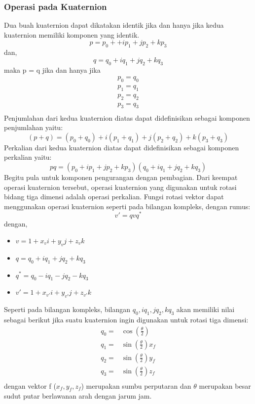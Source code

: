 \subsubsection{Operasi pada Kuaternion}
\label{sssec:operasi_pada_kuaternion}
Dua buah kuaternion dapat dikatakan identik jika dan hanya jika kedua kuaternion memiliki komponen yang identik.
\[
	p = p_0 + +ip_1+jp_2+kp_3
\]
dan,
\[
	q = q_0 + i q_1 + j q_2 + k q_3
\]
maka p = q jika dan hanya jika
\begin{equation}
	\begin{split}
	p_0=q_0\\
	p_1=q_1\\
	p_2=q_2\\
	p_3=q_3\\
	\end{split}
\end{equation}
Penjumlahan dari kedua kuaternion diatas dapat didefinisikan sebagai komponen penjumlahan yaitu:
\[
	(p+q)=(p_0+q_0)+i(p_1+q_1)+j(p_2+q_2)+k(p_3+q_3)
\]
Perkalian dari kedua kuaternion diatas dapat didefinisikan sebagai komponen perkalian yaitu:
\[
	pq = (p_0 +ip_1+jp_2+kp_3)(q_0 + i q_1 + j q_2 + k q_3)
\]
Begitu pula untuk komponen pengurangan dengan pembagian. 
Dari keempat operasi kuaternion tersebut, operasi kuaternion yang digunakan untuk rotasi bidang tiga dimensi adalah operasi perkalian. Fungsi rotasi vektor dapat menggunakan operasi kuaternion seperti pada bilangan kompleks, dengan rumus:
\[
	v' = qvq^*
\]
dengan,
\begin{itemize}
	\item \(v = 1 + x_v i +y_v j + z_v k\)
	\item \(q = q_0 + i q_1 + j q_2 + k q_3	\)
	\item \(q^* =  q_0 - i q_1 - j q_2 - k q_3\)
	\item \(v' = 1 + x_{v'} i +y_{v'} j + z_{v'} k\)
\end{itemize}
Seperti pada bilangan kompleks, bilangan $q_0 ,i q_1,j q_2,k q_3$ akan memiliki nilai sebagai berikut jika suatu kuaternion ingin digunakan untuk rotasi tiga dimensi:
\begin{equation}
	\begin{split}
	q_0=& \cos (\frac{\theta}{2})\\
	q_1=& \sin (\frac{\theta}{2}) x_f\\
	q_2=& \sin (\frac{\theta}{2}) y_f\\
	q_3=& \sin (\frac{\theta}{2}) z_f\\
	\end{split}
\end{equation}
dengan vektor f ($x_f,y_f,z_f$) merupakan sumbu perputaran dan $\theta$ merupakan besar sudut putar berlawanan arah dengan jarum jam.